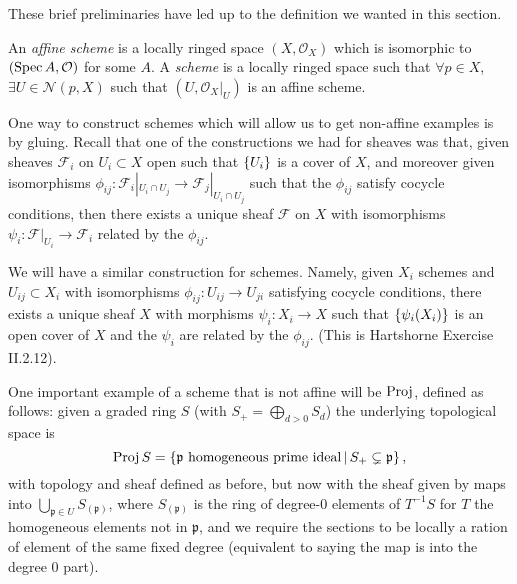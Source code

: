 \documentclass[000-main.tex]{subfiles}
\begin{document}
These brief preliminaries have led up to the definition we wanted in this section.

\begin{definition}
  An \emph{affine scheme} is a locally ringed space $(X, \mathcal{O}_X)$ which is isomorphic to $(\operatorname{Spec} A, \mathcal{O})$ for some $A$.
  A \emph{scheme} is a locally ringed space such that $\forall p \in X$, $\exists U \in \mathcal{N}(p, X)$ such that $(U, \left . \mathcal{O}_X \right \rvert_{U})$ is an affine scheme.
\end{definition}

\begin{example}\label{ex: gluing schemes}
  One way to construct schemes which will allow us to get non-affine examples is by gluing. Recall that one of the constructions we had for sheaves was that, given sheaves $\mathcal{F}_i$ on $U_i \subset X$ open such that $\qty{U_i}$ is a cover of $X$, and moreover given isomorphisms $\phi_{ij} : \mathcal{F}_{i} |_{U_i \cap U_j} \to \mathcal{F}_j |_{U_i \cap U_j}$ such that the $\phi_{ij}$ satisfy cocycle conditions, then there exists a unique sheaf $\mathcal{F}$ on $X$ with isomorphisms $\psi_i : \mathcal{F} |_{U_i} \to \mathcal{F}_i$ related by the $\phi_{ij}$. 
  
  We will have a similar construction for schemes. Namely, given $X_i$ schemes and $U_{ij} \subset X_i$ with isomorphisms $\phi_{ij} : U_{ij} \to U_{ji}$ satisfying cocycle conditions, there exists a unique sheaf $X$ with morphisms $\psi_i : X_i \to X$ such that $\qty{\psi_i(X_i)}$ is an open cover of $X$ and the $\psi_i$ are related by the $\phi_{ij}$. (This is Hartshorne Exercise II.2.12).  
\end{example}

One important example of a scheme that is not affine will be $\operatorname{Proj}$, defined as follows: given a graded ring $S$ (with $S_+ = \bigoplus_{d > 0 } S_d$) the underlying topological space is
\[
  \operatorname{Proj} S = \left \lbrace \mathfrak{p} \text{ homogeneous prime ideal} \, | \, S_+ \subsetneq \mathfrak{p} \right \rbrace ,
\]
with topology and sheaf defined as before, but now with the sheaf given by maps into $\bigcup_{\mathfrak{p} \in U} S_{(\mathfrak{p})}$, where $S_{(\mathfrak{p})}$ is the ring of degree-0 elements of $T^{-1}S$ for $T$ the homogeneous elements not in $\mathfrak{p}$, and we require the sections to be locally a ration of element of the same fixed degree (equivalent to saying the map is into the degree 0 part).

\end{document}
